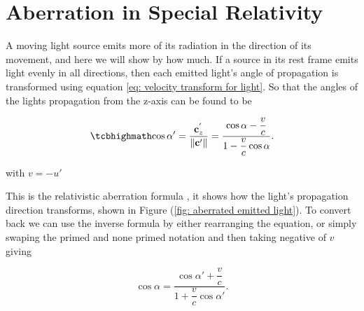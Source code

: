 \section{Aberration in Special Relativity} \label{sect: Aberration in Special Relativity}

A moving light source emits more of its radiation in the direction of its movement, and here we will show by how much.
If a source in its rest frame emits light evenly in all directions, then each emitted light's angle of propagation is transformed using equation \eqref{eq: velocity transform for light}.
So that the angles of the lights propagation from the z-axis can be found to be

\begin{equation}
	\label{eq: Cosine transform}
	\mhl{
		\cos\alpha{'} = \frac{\mathbf{c}_{z}^{'}}{\|\mathbf{c}{'}\|} = \dfrac{\cos\alpha - \dfrac{v}{c} }{1 - \dfrac{v}{c}\cos\alpha}.
	}
\end{equation}

with $v=- u{'}$

This is the relativistic aberration formula \cite{einstein1905electrodynamics}, it shows how the light's propagation direction transforms, shown in Figure (\ref{fig: aberrated emitted light}). To convert back we can use the inverse formula by either rearranging the equation, or simply swaping the primed and none primed notation and then taking negative of $v$ giving

\begin{equation}
	\label{eq: Cosine transform inverse}
		\cos\alpha = \dfrac{\cos\alpha{'} + \dfrac{v}{c} }{1 + \dfrac{v}{c}\cos\alpha{'}}.
\end{equation}

